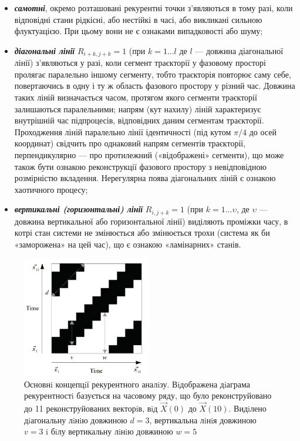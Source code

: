 \documentclass[
  letterpaper,
]{report}
\providecommand{\tightlist}{%
  \setlength{\itemsep}{0pt}\setlength{\parskip}{0pt}}\usepackage{longtable,booktabs,array}
\begin{document}
\begin{itemize}
\tightlist
\item
  \textbf{\emph{самотні}}, окремо розташовані рекурентні точки
  з'являються в тому разі, коли відповідні стани рідкісні, або нестійкі
  в часі, або викликані сильною флуктуацією. При цьому вони не є
  ознаками випадковості або шуму;
\item
  \textbf{\emph{діагональні лінії}} \(R_{i+k, j+k}=1\) (при
  \(k = 1...l\) де \(l\) --- довжина діагональної лінії) з'являються у
  разі, коли сегмент траєкторії у фазовому просторі пролягає паралельно
  іншому сегменту, тобто траєкторія повторює саму себе, повертаючись в
  одну і ту ж область фазового простору у різний час. Довжина таких
  ліній визначається часом, протягом якого сегменти траєкторії
  залишаються паралельними; напрям (кут нахилу) ліній характеризує
  внутрішній час підпроцесів, відповідних даним сегментам траєкторії.
  Проходження ліній паралельно лінії ідентичності (під кутом \(\pi/4\)
  до осей координат) свідчить про однаковий напрям сегментів траєкторії,
  перпендикулярно --- про протилежний («відображені» сегменти), що може
  також бути ознакою реконструкції фазового простору з невідповідною
  розмірністю вкладення. Нерегулярна поява діагональних ліній є ознакою
  хаотичного процесу;
\item
  \textbf{\emph{вертикальні (горизонтальні) лінії}} \(R_{i, j+k}=1\)
  (при \(k = 1...\upsilon\), де \(\upsilon\) --- довжина вертикальної
  або горизонтальної лінії) виділяють проміжки часу, в котрі стан
  системи не змінюється або змінюється трохи (система як би «заморожена»
  на цей час), що є ознакою «ламінарних» станів.
\end{itemize}

\begin{figure}

{\centering 

\includegraphics[width=0.5\textwidth,height=\textheight]{Images/lab_2/recurrence_lines.png}

}

\caption{\label{fig-recurrence-concept}Основнi концепцiї рекурентного
аналiзу. Вiдображена дiаграма рекурентностi базується на часовому ряду,
що було реконструйовано до 11 реконструйованих векторiв, вiд
\(\vec{X}(0)\) до \(\vec{X}(10)\). Видiлено дiагональну лiнiю довжиною
\(d = 3\), вертикальна лiнiя довжиною \(v = 3\) i бiлу вертикальну лiнiю
довжиною \(w = 5\)}

\end{figure}
\end{document}
